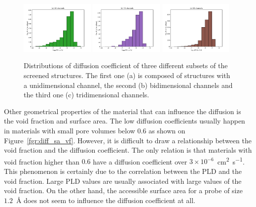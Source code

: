 \documentclass[main]{subfiles}
\begin{document}
\begin{figure}[ht]
  \centering
    \includegraphics[width=0.32\textwidth]{figures/5-diffusion/histogram_chan1D.pdf}
    \includegraphics[width=0.32\textwidth]{figures/5-diffusion/histogram_chan2D.pdf}
    \includegraphics[width=0.32\textwidth]{figures/5-diffusion/histogram_chan3D.pdf}
    \caption{ Distributions of diffusion coefficient of three different subsets of the screened structures. The first one (a) is composed of structures with a unidimensional channel, the second (b) bidimensional channels and the third one (c) tridimensional channels. }\label{fgr:hist_diffusion_chandim}
\end{figure}

Other geometrical properties of the material that can influence the diffusion is the void fraction and surface area. The low diffusion coefficients usually happen in materials with small pore volumes below $0.6$ as shown on Figure~\ref{fgr:diff_sa_vf}. However, it is difficult to draw a relationship between the void fraction and the diffusion coefficient. The only relation is that materials with void fraction higher than $0.6$ have a diffusion coefficient over $3\times 10^{-6}$~\si{\square\cm\per\s}. This phenomenon is certainly due to the correlation between the PLD and the void fraction. Large PLD values are usually associated with large values of the void fraction. On the other hand, the accessible surface area for a probe of size $1.2$~\si{\angstrom} does not seem to influence the diffusion coefficient at all. 
\end{document}
